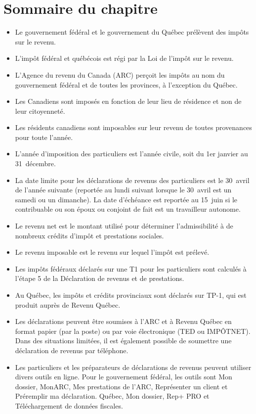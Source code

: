 \section{Sommaire du chapitre}
\begin{itemize}[label=]
	\item Le gouvernement fédéral et le gouvernement du Québec prélèvent des impôts sur le revenu.
	\item L'impôt fédéral et québécois est régi par la Loi de l'impôt sur le revenu.
	\item L'Agence du revenu du Canada (ARC) perçoit les impôts au nom du gouvernement fédéral et de toutes les provinces, à l'exception du Québec.
	\item Les Canadiens sont imposés en fonction de leur lieu de résidence et non de leur citoyenneté.
	\item Les résidents canadiens sont imposables sur leur revenu de toutes provenances pour toute l'année.
	\item L'année d'imposition des particuliers est l'année civile, soit du 1er janvier au 31~décembre.
	\item La date limite pour les déclarations de revenus des particuliers est le 30~avril de l'année suivante (reportée au lundi suivant lorsque le 30~avril est un samedi ou un dimanche). La date d'échéance est reportée au 15~juin si le contribuable ou son époux ou conjoint de fait est un travailleur autonome.
	\item Le revenu net est le montant utilisé pour déterminer l'admissibilité à de nombreux crédits d'impôt et prestations sociales.
	\item Le revenu imposable est le revenu sur lequel l'impôt est prélevé.
	\item Les impôts fédéraux déclarés sur une T1 pour les particuliers sont calculés à l'étape 5 de la Déclaration de revenus et de prestations.
	\item Au Québec, les impôts et crédits provinciaux sont déclarés sur TP-1, qui est produit auprès de Revenu Québec.
	\item Les déclarations peuvent être soumises à l'ARC et à Revenu Québec en format papier (par la poste) ou par voie électronique (TED ou IMPÔTNET). Dans des situations limitées, il est également possible de soumettre une déclaration de revenus par téléphone.
	\item Les particuliers et les préparateurs de déclarations de revenus peuvent utiliser divers outils en ligne. Pour le gouvernement fédéral, les outils sont Mon dossier, MonARC, Mes prestations de l'ARC, Représenter un client et Préremplir ma déclaration. Québec, Mon dossier, Rep+ PRO et Téléchargement de données fiscales.
\end{itemize}
